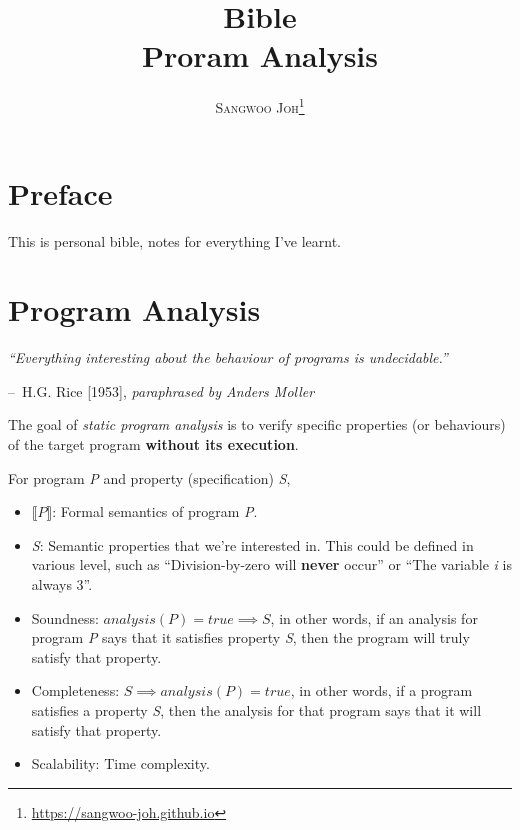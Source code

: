 \documentclass[12pt, twopage]{book}
\title{
  \Huge \textbf{Bible}
  \\
  \huge {Proram Analysis}
}
\author{\textsc{Sangwoo Joh}\footnote{\url{https://sangwoo-joh.github.io}}}
\makeatletter
\newenvironment{chapquote}[2][2em]
  {\setlength{\@tempdima}{#1}%
   \def\chapquote@author{#2}%
   \parshape 1 \@tempdima \dimexpr\textwidth-2\@tempdima\relax%
   \itshape}
  {\par\normalfont\hfill--\ \chapquote@author\hspace*{\@tempdima}\par\bigskip}
\makeatother
\begin{document}
\frontmatter
\maketitle

\tableofcontents  %

\mainmatter


\chapter*{Preface}
This is personal bible, notes for everything I've learnt.


\chapter{Program Analysis}
\begin{chapquote}{H.G. Rice [1953], \textit{paraphrased by Anders Moller}}
  ``Everything interesting about the behaviour of programs is
  undecidable.''
\end{chapquote}

The goal of \textit{static program analysis} is to verify specific
properties (or behaviours) of the target program \textbf{without its
  execution}.

For program \textsl{P} and property (specification) \textsl{S},

\begin{itemize}
\item $ \llbracket P \rrbracket $: Formal semantics of program \textsl{P}.

\item \textsl{S}: Semantic properties that we're interested in. This
  could be defined in various level, such as ``Division-by-zero will
  \textbf{never} occur'' or ``The variable \textit{i} is always 3''.

\item Soundness: $ analysis(P) = true \implies S $, in other words, if
  an analysis for program \textsl{P} says that it satisfies property
  \textsl{S}, then the program will truly satisfy that property.

\item Completeness: $ S \implies analysis(P) = true $, in other words,
  if a program satisfies a property \textsl{S}, then the analysis for
  that program says that it will satisfy that property.

\item Scalability: Time complexity.
\end{itemize}
\end{document}
